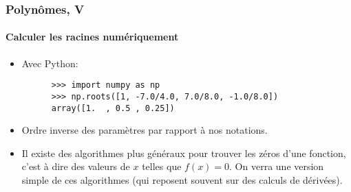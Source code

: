 \documentclass[10pt,notheorems]{beamer}
\theoremstyle{plain}
\theoremstyle{definition} %
\begin{document}
\begin{frame}[fragile]
  \frametitle{Polynômes, V}
  \framesubtitle{Calculer les racines numériquement}
  \hypertarget{slide_polynome_2_racines_5_4}{}

  \bigskip

  \begin{itemize}

  \item Avec Python:\newline

    \begin{verbatim}
      >>> import numpy as np
      >>> np.roots([1, -7.0/4.0, 7.0/8.0, -1.0/8.0])
      array([1.  , 0.5 , 0.25])
    \end{verbatim}

    \bigskip

  \item[\dbend] Ordre inverse des paramètres par rapport à nos notations.\newline

    \bigskip

  \item Il existe des algorithmes plus généraux pour trouver les zéros d'une fonction, c'est à dire des valeurs de $x$ telles que $f(x)=0$. On verra une version simple de ces algorithmes (qui reposent souvent sur des calculs de dérivées).

  \end{itemize}

\end{frame}
\end{document}
